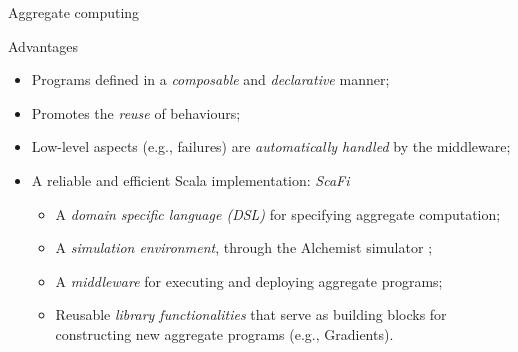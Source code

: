 \documentclass[presentation]{beamer}\mode<presentation>{\usetheme{AMSBolognaFC}}
\begin{document}
\begin{frame}[allowframebreaks]{Aggregate computing}
\begin{alertblock}{Advantages}
	\begin{itemize}
		\item Programs defined in a \emph{composable} and \emph{declarative} manner;
		\item Promotes the \emph{reuse} of behaviours;
		\item Low-level aspects (e.g., failures) are \emph{automatically handled} by the middleware;
		\item A reliable and efficient Scala implementation: \emph{ScaFi} \cite{casadei2022scafi}
		\begin{itemize}
			\item A \emph{domain specific language (DSL)} for specifying aggregate computation;
			\item A \emph{simulation environment}, through the Alchemist simulator \cite{alchemist};
			\item A \emph{middleware} for executing and deploying aggregate programs;
			\item Reusable \emph{library functionalities} that serve as building blocks for constructing new aggregate
			programs (e.g., Gradients).
		\end{itemize}
	\end{itemize}
\end{alertblock}

\end{frame}
\end{document}
